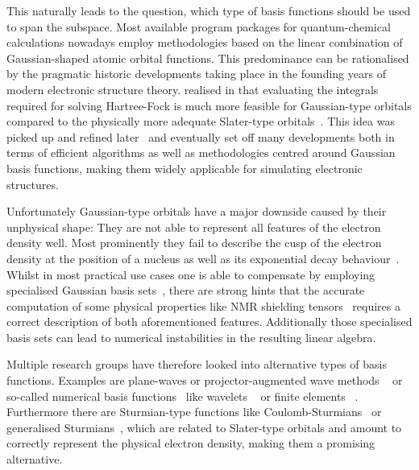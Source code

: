 This naturally leads to the question,
which type of basis functions should be used to span the subspace.
Most available program packages for
quantum-chemical calculations nowadays employ methodologies based on
the linear combination of Gaussian-shaped atomic orbital functions.
This predominance can be rationalised
by the pragmatic historic developments
taking place in the founding years of modern electronic structure theory.
\citet{Boys1950} realised in \citeyear{Boys1950}
that evaluating the integrals
required for solving Hartree-Fock
is much more feasible for Gaussian-type orbitals
compared to the physically more adequate Slater-type orbitals~\cite{Slater1930}.
This idea was picked up and refined later~\cite{Hehre1969}
and eventually set off many developments
both in terms of efficient algorithms as well as methodologies
centred around Gaussian basis functions,
making them widely applicable for simulating electronic structures.

Unfortunately Gaussian-type orbitals have a major downside
caused by their unphysical shape:
They are not able to represent
all features of the electron density well.
Most prominently they fail to describe the cusp of the electron density
at the position of a nucleus as well as its exponential decay behaviour~\cite{Kato1957}.
Whilst in most practical use cases one is able to compensate
by employing specialised Gaussian basis sets~\cite{Jensen2013,Hill2013},
there are strong hints that the accurate computation of some physical properties
like NMR shielding tensors~\cite{Guell2008,Hoggan2009}
requires a correct description of both aforementioned features.
Additionally those specialised basis sets can lead to
numerical instabilities in the resulting linear algebra.

Multiple research groups have therefore looked into alternative types of basis functions.
Examples are plane-waves or projector-augmented wave methods%
~\cite{Kresse1996,Kresse1999,Mortensen2005,Enkovaara2010} or
so-called numerical basis functions~\cite{Frediani2015}
like wavelets%
~\cite{Bischoff2011,Bischoff2012,Bischoff2013,Bischoff2014,Bischoff2014a,Bischoff2017}
or finite elements%
~\cite{Tsuchida1995,Soler2002,Lehtovaara2009,Alizadegan2010,Avery2011PhD,Davydov2015,Boffi2016}.
Furthermore there are Sturmian-type functions
like Coulomb-Sturmians~\cite{Shull1959,Rotenberg1962,Rotenberg1970,Gruzdev1990,Hoggan2009,Randazzo2010}
or generalised Sturmians~\cite{Avery2006,Avery2011PhD,Avery2011,Morales2016,Avery2017,Randazzo2015,Granados2016},
which are related to Slater-type orbitals and amount to correctly represent
the physical electron density,
making them a promising alternative.

